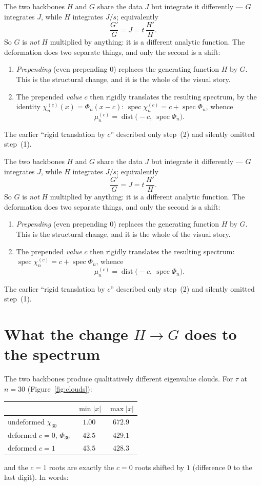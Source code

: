 \documentclass[11pt, fleqn]{amsart}
\theoremstyle{remark}
\DeclareMathOperator{\dist}{dist}
\DeclareMathOperator{\spec}{spec}
\begin{document}
\medskip

The two backbones $H$ and $G$ share the data $J$ but integrate it differently --- $G$
integrates $J$, while $H$ integrates $J/s$; equivalently
\[
\frac{G'}{G}=J=t\,\frac{H'}{H}.
\]
So $G$ is \emph{not} $H$ multiplied by anything: it is a different analytic function. The
deformation does two separate things, and only the second is a shift:
\begin{enumerate}
\item[(1)] \emph{Prepending} (even prepending $0$) replaces the generating function $H$ by
$G$. This is the structural change, and it is the whole of the visual story.
\item[(2)] The prepended \emph{value} $c$ then rigidly translates the resulting spectrum, by
the identity $\chi_n^{(c)}(x)=\Phi_n(x-c)$: $\spec\chi_n^{(c)}=c+\spec\Phi_n$, whence
\[
\mu_n^{(c)}=\dist\!\big(-c,\ \spec\Phi_n\big).
\]
\end{enumerate}
The earlier ``rigid translation by $c$'' described only step~(2) and silently omitted
step~(1).

\medskip

The two backbones $H$ and $G$ share the data $J$ but integrate it differently --- $G$
integrates $J$, while $H$ integrates $J/s$; equivalently
\[
\frac{G'}{G}=J=t\,\frac{H'}{H}.
\]
So $G$ is \emph{not} $H$ multiplied by anything: it is a different analytic function. The
deformation does two separate things, and only the second is a shift:
\begin{enumerate}
\item[(1)] \emph{Prepending} (even prepending $0$) replaces the generating function $H$ by
$G$. This is the structural change, and it is the whole of the visual story.
\item[(2)] The prepended \emph{value} $c$ then rigidly translates the resulting spectrum:
$\spec\chi_n^{(c)}=c+\spec\Phi_n$, whence
\[
\mu_n^{(c)}=\dist\!\big(-c,\ \spec\Phi_n\big).
\]
\end{enumerate}
The earlier ``rigid translation by $c$'' described only step~(2) and silently omitted
step~(1).

\section{What the change \texorpdfstring{$H\to G$}{H to G} does to the spectrum}\label{sec:change}

The two backbones produce qualitatively different eigenvalue clouds. For $\tau$ at $n=30$
(Figure~\ref{fig:clouds}):
\begin{center}
\begin{tabular}{lcc}
\toprule
 & $\min|x|$ & $\max|x|$\\
\midrule
undeformed $\chi_{30}$ & $1.00$ & $672.9$\\
deformed $c=0$, $\Phi_{30}$ & $42.5$ & $429.1$\\
deformed $c=1$ & $43.5$ & $428.3$\\
\bottomrule
\end{tabular}
\end{center}
and the $c=1$ roots are exactly the $c=0$ roots shifted by $1$ (difference $0$ to the last
digit). In words:
\end{document}
